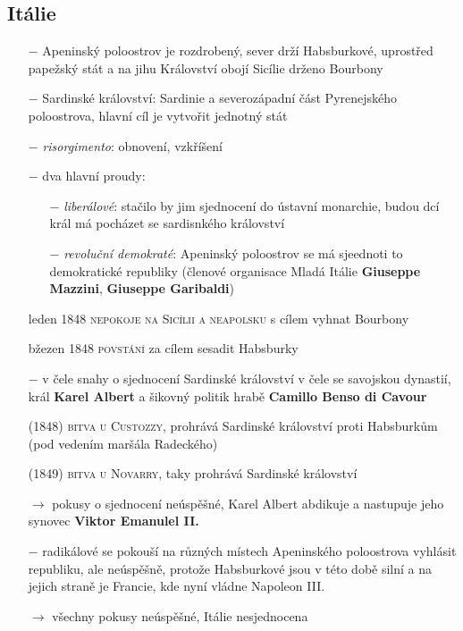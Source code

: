 \documentclass{article}
\begin{document}
\subsection*{Itálie}
\begin{itemize}
    \vspace{-0.5em}
    \setlength\itemsep{0.15em}
    \item[$-$] Apeninský poloostrov je rozdrobený, sever drží Habsburkové, uprostřed papežský stát a na jihu Království obojí Sicílie drženo Bourbony
    \item[$-$] Sardinské království: Sardinie a severozápadní část Pyrenejského poloostrova, hlavní cíl je vytvořit jednotný stát
    \item[$-$] \textit{risorgimento}: obnovení, vzkříšení
    \item[$-$] dva hlavní proudy:
    \begin{itemize}
        \vspace{-0.5em}
        \setlength\itemsep{0.15em}
        \item[$-$] \textit{liberálové}: stačilo by jim sjednocení do ústavní monarchie, budou dcí král má pocházet se sardisnkého království
        \item[$-$] \textit{revoluční demokraté}: Apeninský poloostrov se má sjeednoti to demokratické republiky (členové organisace Mladá Itálie \textbf{Giuseppe Mazzini}, \textbf{Giuseppe Garibaldi})
    \end{itemize}
    \item[leden 1848] \textsc{nepokoje na Sicílii a neapolsku} s cílem vyhnat Bourbony
    \item[bžezen 1848] \textsc{povstání} za cílem sesadit Habsburky
    \item[$-$] v čele snahy o sjednocení Sardinské království v čele se savojskou dynastií, král \textbf{Karel Albert} a šikovný politik hrabě \textbf{Camillo Benso di Cavour}
    \item[(1848)] \textsc{bitva u Custozzy}, prohrává Sardinské království proti Habsburkům (pod vedením maršála Radeckého)
    \item[(1849)] \textsc{bitva u Novarry}, taky prohrává Sardinské království
    \item[$\rightarrow$] pokusy o sjednocení neúspěšné, Karel Albert abdikuje a nastupuje jeho synovec \textbf{Viktor Emanulel II.}
    \item[$-$] radikálové se pokouší na různých místech Apeninského poloostrova vyhlásit republiku, ale neúspěšně, protože Habsburkové jsou v této době silní a na jejich straně je Francie, kde nyní vládne Napoleon III.
    \item[$\rightarrow$] všechny pokusy neúspěšné, Itálie nesjednocena
\end{itemize}
\end{document}
